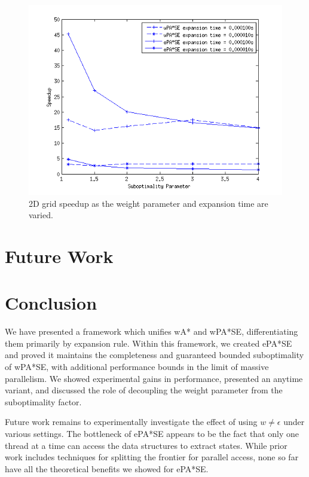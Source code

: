 \documentclass[letterpaper]{article}
\begin{document}
\begin{figure}[fig:tps]
\centering\includegraphics[scale=0.55]{eps_sweep_para.png}
\caption{2D grid speedup as the weight parameter and expansion time are varied.}
\end{figure}

\section{Future Work}

\section{Conclusion}

We have presented a framework which unifies wA* and wPA*SE, differentiating them primarily by expansion rule. Within this framework, we created ePA*SE and proved it maintains the completeness and guaranteed bounded suboptimality of wPA*SE, with additional performance bounds in the limit of massive parallelism. We showed experimental gains in performance, presented an anytime variant, and discussed the role of decoupling the weight parameter from the suboptimality factor.

Future work remains to experimentally investigate the effect of using $w \ne \epsilon$ under various settings. The bottleneck of ePA*SE appears to be the fact that only one thread at a time can access the data structures to extract states. While prior work includes techniques for splitting the frontier for parallel access, none so far have all the theoretical benefits we showed for ePA*SE.



\end{document}
